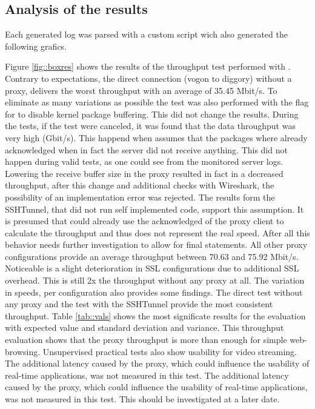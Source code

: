 \documentclass[12pt, a4paper]{scrartcl}
\begin{document}
\subsection{Analysis of the results}
Each generated log was parsed with a custom script wich also generated the following grafics.

\noindent Figure \@\ref{fig::boxres} shows the results of the throughput test performed with . Contrary to expectations, the direct connection (vogon to diggory) without a proxy, delivers the worst throughput with an average of 35.45 Mbit/s. To eliminate as many variations as possible the test was also performed with the  flag for  to disable kernel package buffering. This did not change the results.\newline
During the tests, if the test were canceled, it was found that the data throughput was very high (Gbit/s). This happend when  assumes that the packages where already acknowledged when in fact the server did not receive anything. This did not happen during valid tests, as one could see from the monitored server logs. Lowering the receive buffer size in the proxy resulted in fact in a decreased throughput, after this change and additional checks with Wireshark, the possibility of an implementation error was rejected. The results form the SSHTunnel, that did not run self implemented code, support this assumption. It is presumed that  could already use the acknowledged of the proxy client to calculate the throughput and thus does not represent the real speed. After all this behavior needs further investigation to allow for final statements.\newline
All other proxy configurations provide an average throughput between 70.63 and 75.92 Mbit/s. Noticeable is a slight deterioration in \ac{SSL} configurations due to additional \ac{SSL} overhead. This is still 2x the throughput without any proxy at all. The variation in speeds, per configuration also provides some findings. The direct test without any proxy and the test with the SSHTunnel provide the most consistent throughput. Table \ref{tab::vals} shows the most significate results for the evaluation with expected value and standard deviation and variance.\newline
This throughput evaluation shows that the proxy throughput is more than enough for simple web-browsing. Unsupervised practical tests also show usability for video streaming. The additional latency caused by the proxy, which could influence the usability of real-time applications, was not measured in this test. The additional latency caused by the proxy, which could influence the usability of real-time applications, was not measured in this test. This should be investigated at a later date.
\end{document}
